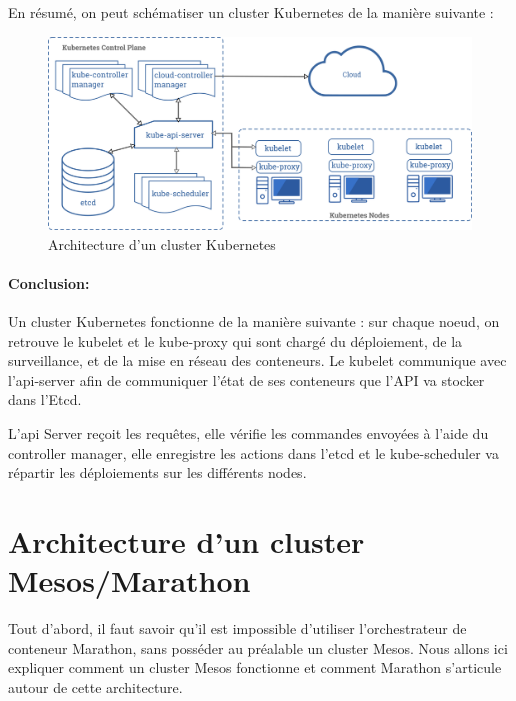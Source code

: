 \documentclass[11pt,fleqn]{book} %
\begin{document}
En résumé, on peut schématiser un cluster Kubernetes de la manière suivante :

\begin{figure}[H]\centering
\renewcommand{\figurename}{Schéma}
\includegraphics[scale=0.1]{Pictures/Comparaison/Kubernetes-cluster-archi.png}
\captionsetup{margin=1.5cm,format=hang,justification=justified}
\caption[]{Architecture d'un cluster Kubernetes \newline}
\end{figure}



\begin{interrupt}
\paragraph{Conclusion:}
Un cluster Kubernetes fonctionne de la manière suivante :
sur chaque noeud, on retrouve le kubelet et le kube-proxy qui sont chargé du déploiement, de la surveillance, et de la mise en réseau des conteneurs. Le kubelet communique avec l'api-server afin de communiquer l'état de ses conteneurs que l'API va stocker dans l'Etcd.\newline

L'api Server reçoit les requêtes, elle vérifie les commandes envoyées à l'aide du controller manager, elle enregistre les actions dans l'etcd et le kube-scheduler va répartir les déploiements sur les différents nodes.
\end{interrupt}

\section*{Architecture d'un cluster Mesos/Marathon}
Tout d'abord, il faut savoir qu'il est impossible d'utiliser l'orchestrateur de conteneur Marathon, sans posséder au préalable un cluster Mesos. Nous allons ici expliquer comment un cluster Mesos fonctionne et comment Marathon s'articule autour de cette architecture.
\end{document}
